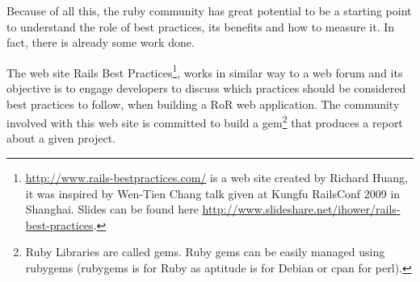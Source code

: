 Because of all this, the ruby community has great potential to be a starting point to understand the role of best practices, its benefits and how to measure it.
In fact, there is already some work done.

The web site
\textsf{Rails Best Practices}\footnote{\url{http://www.rails-bestpractices.com/} is a web site created by Richard Huang,
it was inspired by Wen-Tien Chang talk given at Kungfu RailsConf 2009 in Shanghai. Slides can be found here
\url{http://www.slideshare.net/ihower/rails-best-practices}.},
works in similar way to a web forum and its objective is to engage developers to discuss which practices
should be considered best practices to follow, when building a RoR web application.
The community involved with this web site is committed to build a
gem\footnote{Ruby Libraries are called gems. Ruby gems can be easily managed using rubygems (rubygems is for Ruby as aptitude is for Debian or cpan for perl).}
that produces a report about a given project.




% 
% 
% 
% 
%  
% 
% 
% 

